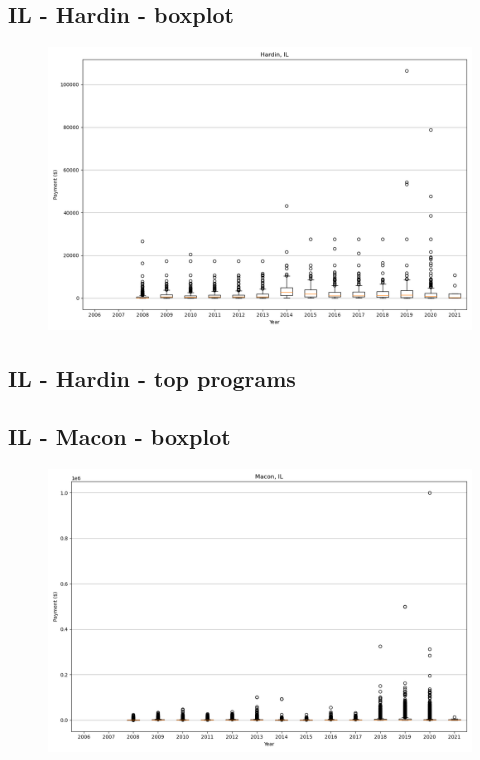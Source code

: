 \subsection*{IL - Hardin - boxplot}
\begin{figure}[h]
\centering
\includegraphics[width=7in]{../output/boxplots/counties/Hardin-IL_boxplot.png}
\end{figure}


\subsection*{IL - Hardin - top programs}

\newpage
\subsection*{IL - Macon - boxplot}
\begin{figure}[h]
\centering
\includegraphics[width=7in]{../output/boxplots/counties/Macon-IL_boxplot.png}
\end{figure}


